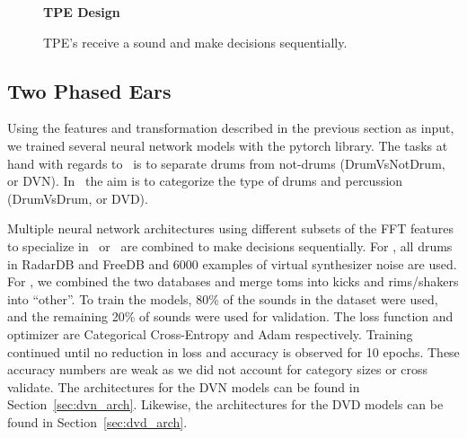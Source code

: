\documentclass[\main/thesis.tex]{subfiles}
\begin{document}
\label{TPE_models}
\begin{figure}[tbp]
    \begin{center}
    \textbf{TPE Design}
    \end{center}
    \caption{TPE's receive a sound and make decisions sequentially.}
\label{fig:TPE_design}
\end{figure}

\subsection{Two Phased Ears}

Using the features and transformation described in the previous section as input, we trained several neural network models with the pytorch library. The tasks at hand with regards to \decfirst~is to separate drums from not-drums (DrumVsNotDrum, or DVN). In \decsecond~the aim is to categorize the type of drums and percussion (DrumVsDrum, or DVD). 

 Multiple neural network architectures using different subsets of the FFT features to specialize in \decfirst~or \decsecond~are combined to make decisions sequentially. For \decfirst, all drums in RadarDB and FreeDB and 6000 examples of virtual synthesizer noise are used. For \decsecond, we combined the two databases and merge toms into kicks and rims/shakers into \enquote{other}. To train the models, 80\% of the sounds in the dataset were used, and the remaining 20\% of sounds were used for validation. The loss function and optimizer are Categorical Cross-Entropy and Adam respectively. Training continued until no reduction in loss and accuracy is observed for 10 epochs. These accuracy numbers are weak as we did not account for category sizes or cross validate. The architectures for the DVN models can be found in Section~\ref{sec:dvn_arch}. Likewise, the architectures for the DVD models can be found in Section~\ref{sec:dvd_arch}.
\end{document}
